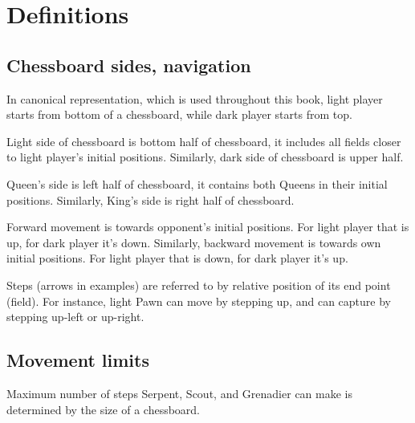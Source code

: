 

\chapter*{Definitions}
\label{ch:Definitions}

\section*{Chessboard sides, navigation}
\label{sec:Definitions/Chessboard sides, navigation}

In canonical representation, which is used throughout this book, light player
starts from bottom of a chessboard, while dark player starts from top.

Light side of chessboard is bottom half of chessboard, it includes all fields
closer to light player's initial positions. Similarly, dark side of chessboard
is upper half.

Queen's side is left half of chessboard, it contains both Queens in their
initial positions. Similarly, King's side is right half of chessboard.

Forward movement is towards opponent's initial positions. For light player
that is up, for dark player it's down. Similarly, backward movement is towards
own initial positions. For light player that is down, for dark player it's up.

Steps (arrows in examples) are referred to by relative position of its end point
(field). For instance, light Pawn can move by stepping up, and can capture by
stepping up-left or up-right.

\clearpage %

\section*{Movement limits}
\label{sec:Definitions/Movement limits}

Maximum number of steps Serpent, Scout, and Grenadier can make is determined
by the size of a chessboard.

